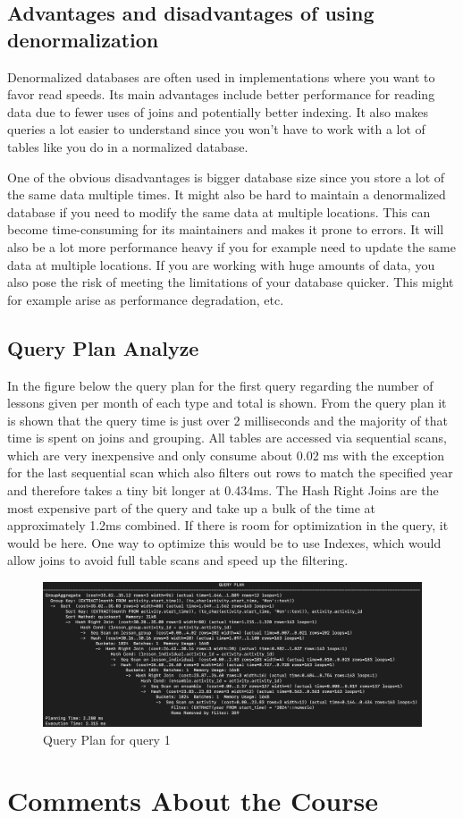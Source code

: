 \documentclass[a4paper]{scrartcl}
\begin{document}
\subsection{Advantages and disadvantages of using denormalization}
Denormalized databases are often used in implementations where you want to favor read speeds. Its main advantages include better performance for reading data due to fewer uses of joins and potentially better indexing. It also makes queries a lot easier to understand since you won't have to work with a lot of tables like you do in a normalized database.

One of the obvious disadvantages is bigger database size since you store a lot of the same data multiple times. It might also be hard to maintain a denormalized database if you need to modify the same data at multiple locations. This can become time-consuming for its maintainers and makes it prone to errors. It will also be a lot more performance heavy if you for example need to update the same data at multiple locations. If you are working with huge amounts of data, you also pose the risk of meeting the limitations of your database quicker. This might for example arise as performance degradation, etc.

\subsection{Query Plan Analyze}
In the figure below the query plan for the first query regarding the number of lessons given per month of each type and total is shown. From the query plan it is shown that the query time is just over 2 milliseconds and the majority of that time is spent on joins and grouping. All tables are accessed via sequential scans, which are very inexpensive and only consume about 0.02 ms with the exception for the last sequential scan which also filters out rows to match the specified year and therefore takes a tiny bit longer at 0.434ms. The Hash Right Joins are the most expensive part of the query and take up a bulk of the time at approximately 1.2ms combined. If there is room for optimization in the query, it would be here. One way to optimize this would be to use Indexes, which would allow joins to avoid full table scans and speed up the filtering.

\begin{figure}[H]
    \begin{center}
      \includegraphics[scale=0.34]{Explain Analyze Q1.png}
      \caption{Query Plan for query 1}
      \label{fig:diag}
    \end{center}
  \end{figure}

\section{Comments About the Course}
\end{document}
